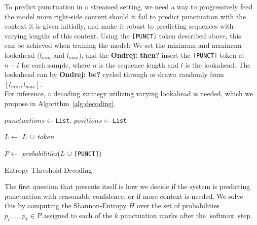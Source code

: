 \documentclass[bsc,deptreport,ai]{infthesis} %
\newcommand{\Ondrej}[1]{{\color{red} \textbf{Ondrej: #1}}}
\DeclareMathOperator{\softmax}{softmax}
\begin{document}
To predict punctuation in a streamed setting, we need a way to progressively feed the model more right-side context should it fail to predict punctuation with the context it is given initially, and make it robust to predicting sequences with varying lengths of this context. Using the \texttt{[PUNCT]} token described above, this can be achieved when training the model: We set the minimum and maximum lookahead ($l_{min}$ and $l_{max}$), and the \Ondrej{then?} insert the \texttt{[PUNCT]} token at $n-l$ for each sample, where $n$ is the sequence length and $l$ is the lookahead. The lookahead can by \Ondrej{be?} cycled through or drawn randomly from $[l_{min}, l_{max}]$.\\
For inference, a decoding strategy utilizing varying lookahead is needed, which we propose in Algorithm~\ref{alg:decoding}.
\begin{algorithm}
\SetAlgoLined
{}
$punctuations \leftarrow $\texttt{List}, $positions \leftarrow $\texttt{List}

$L\leftarrow $ $L~\cup~token$

$P \leftarrow $ \textit{probabilities}($L$ $\cup$ \texttt{[PUNCT]})

\caption{Entropy Threshold Decoding}
\label{alg:decoding}
\end{algorithm}
The first question that presents itself is how we decide if the system is predicting punctuation with reasonable confidence, or if more context is needed. We solve this by computing the Shannon-Entropy \citep{entropy} $H$ over the set of probabilities $p_i,...,p_k\in P$ assigned to each of the $k$ punctuation marks after the $\softmax$ step.
\end{document}

